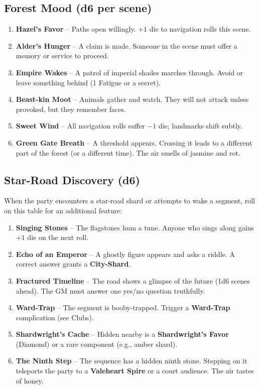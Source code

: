 \subsection*{Forest Mood (d6 per scene)}
\begin{tcolorbox}[colback=black!3,colframe=blue!60!black,title=Forest Mood Table,breakable]
\begin{enumerate}
\item \textbf{Hazel's Favor} -- Paths open willingly. $+1$ die to navigation rolls this scene.
\item \textbf{Alder's Hunger} -- A claim is made. Someone in the scene must offer a memory or service to proceed.
\item \textbf{Empire Wakes} -- A patrol of imperial shades marches through. Avoid or leave something behind (1 Fatigue or a secret).
\item \textbf{Beast-kin Moot} -- Animals gather and watch. They will not attack unless provoked, but they remember faces.
\item \textbf{Sweet Wind} -- All navigation rolls suffer $-1$ die; landmarks shift subtly.
\item \textbf{Green Gate Breath} -- A threshold appears. Crossing it leads to a different part of the forest (or a different time). The air smells of jasmine and rot.
\end{enumerate}
\end{tcolorbox}

\subsection*{Star-Road Discovery (d6)}
When the party encounters a star-road shard or attempts to wake a segment, roll on this table for an additional feature:
\begin{enumerate}
\item \textbf{Singing Stones} -- The flagstones hum a tune. Anyone who sings along gains $+1$ die on the next roll.
\item \textbf{Echo of an Emperor} -- A ghostly figure appears and asks a riddle. A correct answer grants a \textbf{City-Shard}.
\item \textbf{Fractured Timeline} -- The road shows a glimpse of the future (1d6 scenes ahead). The GM must answer one yes/no question truthfully.
\item \textbf{Ward-Trap} -- The segment is booby-trapped. Trigger a \textbf{Ward-Trap} complication (see Clubs).
\item \textbf{Shardwright's Cache} -- Hidden nearby is a \textbf{Shardwright's Favor} (Diamond) or a rare component (e.g., amber shard).
\item \textbf{The Ninth Step} -- The sequence has a hidden ninth stone. Stepping on it teleports the party to a \textbf{Valeheart Spire} or a court audience. The air tastes of honey.
\end{enumerate}

